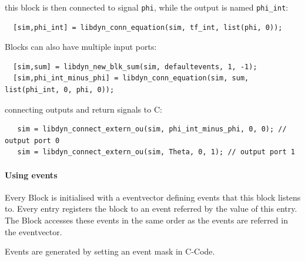 \documentclass[%
	pdftex,%
	a4paper,%
	oneside,%
	11pt,%
	halfparskip,%
	headsepline,%
	bibtotocnumbered,%
	idxtotoc%
]{scrartcl}
\begin{document}
this block is then connected to signal \texttt{phi}, while the output is named \texttt{phi\_int}:

\begin{verbatim}
  [sim,phi_int] = libdyn_conn_equation(sim, tf_int, list(phi, 0));
\end{verbatim}

Blocks can also have multiple input ports:

\begin{verbatim}
  [sim,sum] = libdyn_new_blk_sum(sim, defaultevents, 1, -1);
  [sim,phi_int_minus_phi] = libdyn_conn_equation(sim, sum, list(phi_int, 0, phi, 0));
\end{verbatim}

connecting outputs and return signals to C:

\begin{verbatim}
   sim = libdyn_connect_extern_ou(sim, phi_int_minus_phi, 0, 0); // output port 0
   sim = libdyn_connect_extern_ou(sim, Theta, 0, 1); // output port 1
\end{verbatim}


\paragraph{Using events}

Every Block is initialised with a eventvector defining events that this block listens to. Every entry registers the block to an event referred by the value of this entry. The Block accesses these events in the same order as the events are referred in the eventvector. 


Events are generated by setting an event mask in C-Code.



% 
% 
% 
% 
% 
% 
% 
\end{document}
